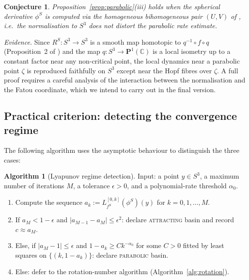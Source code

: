 \documentclass[12pt]{article}
\newtheorem{conjecture}[theorem]{Conjecture}
\theoremstyle{definition}
\newtheorem{algorithm_desc}[theorem]{Algorithm}
\newcommand{\C}{\mathbb{C}}
\newcommand{\Pone}{\mathbf{P}^1(\C)}
\newcommand{\RS}{R^S}
\begin{document}
\begin{conjecture}\label{conj:parabolic_hopf}
  Proposition~\ref{prop:parabolic}(iii) holds when the spherical
  derivative $\phi^S$ is computed via the homogeneous bihomogeneous pair
  $(U,V)$ of \cite[Def.~16]{Alvarez2023}, i.e.~the normalisation to $S^3$
  does not distort the parabolic rate estimate.
\end{conjecture}

\noindent\textit{Evidence.}  Since $\RS: S^3 \to S^3$ is a smooth map
homotopic to $q^{-1} \circ f \circ q$ (Proposition~2 of \cite{Alvarez2023})
and the map $q: S^3 \to \Pone$ is a local isometry up to a constant
factor near any non-critical point, the local dynamics near a parabolic
point $\zeta$ is reproduced faithfully on $S^3$ except near the Hopf
fibres over $\zeta$.  A full proof requires a careful analysis of the
interaction between the normalisation and the Fatou coordinate, which we
intend to carry out in the final version.

\subsection{Practical criterion: detecting the convergence regime}

The following algorithm uses the asymptotic behaviour to distinguish the
three cases:

\begin{algorithm_desc}[Lyapunov regime detection]\label{alg:lyapunov}
  Input: a point $y \in S^3$, a maximum number of iterations $M$,
  a tolerance $\epsilon > 0$, and a polynomial-rate threshold $\alpha_0$.
  \begin{enumerate}[label=Step \arabic*.]
    \item Compute the sequence $a_k := L_{f^S}^{[0,k]}(\phi^S)(y)$ for
          $k = 0, 1, \ldots, M$.
    \item If $a_M < 1 - \epsilon$ and
          $|a_{M-1} - a_M| \le \epsilon^2$:
          declare \textsc{attracting} basin and record $c \approx a_M$.
    \item Else, if $|a_M - 1| \le \epsilon$ and
          $1 - a_k \ge C k^{-\alpha_0}$ for some $C > 0$ fitted by least
          squares on $\{(k, 1-a_k)\}$:
          declare \textsc{parabolic} basin.
    \item Else: defer to the rotation-number algorithm
          (Algorithm~\ref{alg:rotation}).
  \end{enumerate}
\end{algorithm_desc}
\end{document}
